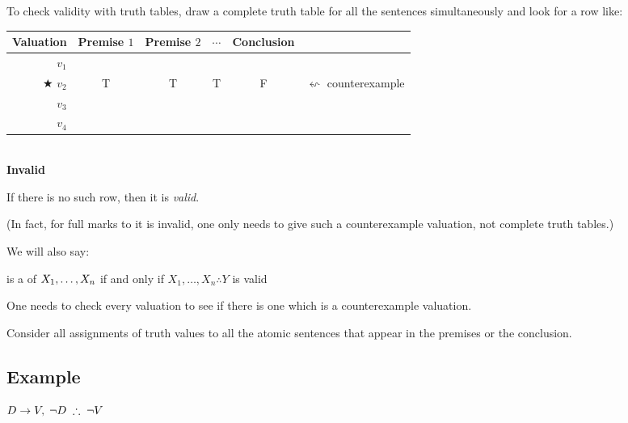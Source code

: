 \begin{highlighted}
	To check {validity} with truth tables, draw a complete truth table for all the sentences simultaneously and look for a row like:
	
	\begin{center}
		\begin{tabular}{r || c |c |c || c c}
			Valuation & Premise $1$ & Premise $2$ & $\cdots$ & Conclusion\\
			\hline
			$v_1$&&&&\\
			$\bigstar$ $v_2$  & T & T & T & {F} &$\leftsquigarrow$ counterexample\\
			$v_3$&&&&\\
			$v_4$&&&&
		\end{tabular}\\ \textbf{Invalid}
	\end{center}
	
	
	If there is no such row, then it is \emph{valid}. 
\end{highlighted}
(In fact, for full marks to it is invalid, one only needs to give such a counterexample valuation, not complete truth tables.)

We will also say:
\begin{highlighted}
	\metaY is a  of $X_1,\ldots,X_n$ if and only if $X_1,\ldots,X_n\therefore Y$ is {valid}
\end{highlighted}

One needs to check every valuation to see if there is one which is a counterexample valuation. 

Consider all assignments of truth values to all the atomic sentences that appear in the premises or the conclusion.


\subsection{Example}


$D\eif V,\;\enot D\;\therefore\;\enot V$

